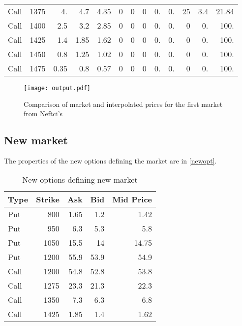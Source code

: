 \documentclass{article}
\begin{document}
\begin{table}[h]
\begin{tabular}{lrrrrrrrrrrrr}
        Call & 1375 & 4.   & 4.7  & 4.35  & 0   & 0   & 0    & 0.     & 0.     & 25   & 3.4   & 21.84  \\
        Call & 1400 & 2.5  & 3.2  & 2.85  & 0   & 0   & 0    & 0.     & 0.     & 0    & 0.    & 100.   \\
        Call & 1425 & 1.4  & 1.85 & 1.62  & 0   & 0   & 0    & 0.     & 0.     & 0    & 0.    & 100.   \\
        Call & 1450 & 0.8  & 1.25 & 1.02  & 0   & 0   & 0    & 0.     & 0.     & 0    & 0.    & 100.   \\
        Call & 1475 & 0.35 & 0.8  & 0.57  & 0   & 0   & 0    & 0.     & 0.     & 0    & 0.    & 100.   \\
        \bottomrule
    \end{tabular}


\end{table}

\begin{figure}[htbp]
    \centering
    \caption{Comparison of market and interpolated prices
        for the first market from Neftci's
        \label{fig:options_prices}}
    \texttt{[image: output.pdf]}
\end{figure}

\subsection{New market}
The properties of the new options defining the market are in \autoref{newopt}.
\begin{table}
    \centering
    \caption{New options defining new market\label{newopt}}
    \begin{tabular}{lrrrr}
        \toprule
        Type & Strike & Ask  & Bid  & Mid Price \\
        \midrule
        Put  & 800    & 1.65 & 1.2  & 1.42      \\
        Put  & 950    & 6.3  & 5.3  & 5.8       \\
        Put  & 1050   & 15.5 & 14   & 14.75     \\
        Put  & 1200   & 55.9 & 53.9 & 54.9      \\
        Call & 1200   & 54.8 & 52.8 & 53.8      \\
        Call & 1275   & 23.3 & 21.3 & 22.3      \\
        Call & 1350   & 7.3  & 6.3  & 6.8       \\
        Call & 1425   & 1.85 & 1.4  & 1.62      \\
        \bottomrule
    \end{tabular}
\end{table}
\end{document}
